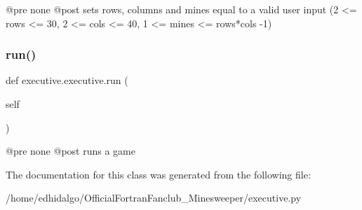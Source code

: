 \begin{DoxyVerb}@pre none
@post sets rows, columns and mines equal to a valid user input (2 <= rows <= 30, 2 <= cols <= 40, 1 <= mines <= rows*cols -1)
\end{DoxyVerb}
 \mbox{\label{classexecutive_1_1executive_abe92cddf119081cac6c747858df061d7}} 
\subsubsection{\texorpdfstring{run()}{run()}}
{\footnotesize\ttfamily def executive.\+executive.\+run (\begin{DoxyParamCaption}\item[{}]{self }\end{DoxyParamCaption})}

\begin{DoxyVerb}@pre none
@post runs a game
\end{DoxyVerb}
 

The documentation for this class was generated from the following file\+:\begin{DoxyCompactItemize}
\item 
/home/edhidalgo/\+Official\+Fortran\+Fanclub\+\_\+\+Minesweeper/executive.\+py\end{DoxyCompactItemize}

